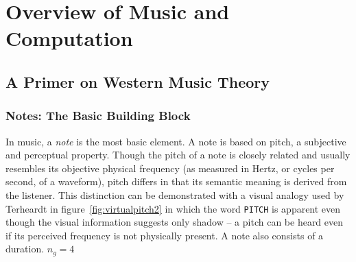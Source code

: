 \chapter{Overview of Music and Computation} \label{chintro} 

\section{A Primer on Western Music Theory}

\subsection{Notes: The Basic Building Block}

In music, a \textit{note} is the most basic element. A note is based on pitch, a subjective and perceptual property. Though the pitch of a note is closely related and usually resembles its objective physical frequency (as measured in Hertz, or cycles per second, of a waveform), pitch differs in that its semantic meaning is derived from the listener. This distinction can be demonstrated with a visual analogy used by Terheardt\cite{terhardt1974pitch} in figure~\ref{fig:virtualpitch2} in which the word \texttt{PITCH} is apparent even though the visual information suggests only shadow -- a pitch can be heard even if its perceived frequency is not physically present. A note also consists of a duration. $n_g=4$